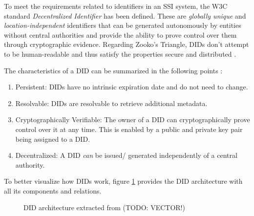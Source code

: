         To meet the requirements related to identifiers in an \ac{SSI} system, the W3C standard \textit{Decentralized Identifier} has been defined. These are \textit{globally unique} and \textit{location-independent} identifiers that can be generated autonomously by entities without central authorities and provide the ability to prove control over them through cryptographic evidence. Regarding Zooko's Triangle, \acp{DID} don't attempt to be human-readable and thus satisfy the properties secure and distributed \cite[p. 185]{preukschat_self-sovereign_2021}. \cite{sporny_decentralized_2021}
        
        The characteristics of a \ac{DID} can be summarized in the following points \cite[p. 160]{preukschat_self-sovereign_2021}: 
        
        \begin{enumerate}
        	\item Persistent: \acp{DID} have no intrinsic expiration date and do not need to change.
        	\item Resolvable: \acp{DID} are resolvable to retrieve additional metadata.
        	\item Cryptographically Verifiable: The owner of a \ac{DID} can cryptographically prove control over it at any time. This is enabled by a public and private key pair being assigned to a \ac{DID}.
        	\item Decentralized: A \ac{DID} \textit{can} be issued/ generated independently of a central authority.
        \end{enumerate}
        
        To better visualize how \acp{DID} work, figure \ref{figure: didArchitecture} provides the \ac{DID} architecture with all its components and relations.
        
        \begin{figure}[ht]
    	    \centering
            \caption{\ac{DID} architecture extracted from \cite{sporny_decentralized_2021} (TODO: VECTOR!)}
            \label{figure: didArchitecture}
        \end{figure}
        
